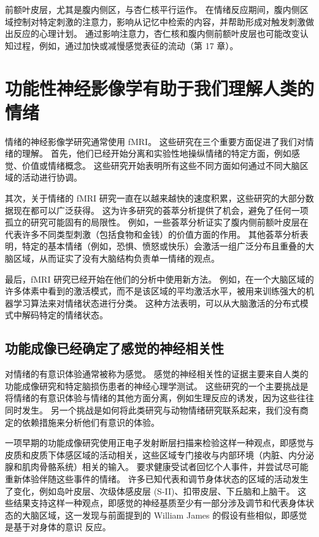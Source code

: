 前额叶皮层，尤其是腹内侧区，与杏仁核平行运作。 在情绪反应期间，腹内侧区域控制对特定刺激的注意力，影响从记忆中检索的内容，并帮助形成对触发刺激做出反应的心理计划。 通过影响注意力，杏仁核和腹内侧前额叶皮层也可能改变认知过程，例如，通过加快或减慢感觉表征的流动（第 17 章）。


\section{功能性神经影像学有助于我们理解人类的情绪}

情绪的神经影像学研究通常使用 fMRI。 这些研究在三个重要方面促进了我们对情绪的理解。 首先，他们已经开始分离和实验性地操纵情绪的特定方面，例如感觉、价值或情绪概念。 这些研究开始表明所有这些不同方面如何通过不同大脑区域的活动进行协调。

其次，关于情绪的 fMRI 研究一直在以越来越快的速度积累，这些研究的大部分数据现在都可以广泛获得。 这为许多研究的荟萃分析提供了机会，避免了任何一项孤立的研究可能固有的局限性。 例如，一些荟萃分析证实了腹内侧前额叶皮层在代表许多不同类型刺激（包括食物和金钱）的价值方面的作用。 其他荟萃分析表明，特定的基本情绪（例如，恐惧、愤怒或快乐）会激活一组广泛分布且重叠的大脑区域，从而证实了没有大脑结构负责单一情绪的观点。

最后，fMRI 研究已经开始在他们的分析中使用新方法。 例如，在一个大脑区域的许多体素中看到的激活模式，而不是该区域的平均激活水平，被用来训练强大的机器学习算法来对情绪状态进行分类。 这种方法表明，可以从大脑激活的分布式模式中解码特定的情绪状态。

\subsection{功能成像已经确定了感觉的神经相关性}
对情绪的有意识体验通常被称为感觉。 感觉的神经相关性的证据主要来自人类的功能成像研究和特定脑损伤患者的神经心理学测试。 这些研究的一个主要挑战是将情绪的有意识体验与情绪的其他方面分离，例如生理反应的诱发，因为这些往往同时发生。 另一个挑战是如何将此类研究与动物情绪研究联系起来，我们没有商定的依赖措施来分析他们有意识的体验。

一项早期的功能成像研究使用正电子发射断层扫描来检验这样一种观点，即感觉与皮质和皮质下体感区域的活动相关，这些区域专门接收与内部环境（内脏、内分泌腺和肌肉骨骼系统）相关的输入。 要求健康受试者回忆个人事件，并尝试尽可能重新体验伴随这些事件的情绪。 许多已知代表和调节身体状态的区域的活动发生了变化，例如岛叶皮层、次级体感皮层 (S-II)、扣带皮层、下丘脑和上脑干。 这些结果支持这样一种观点，即感觉的神经基质至少有一部分涉及调节和代表身体状态的大脑区域，这一发现与前面提到的 William James 的假设有些相似，即感觉是基于对身体的意识 反应。

